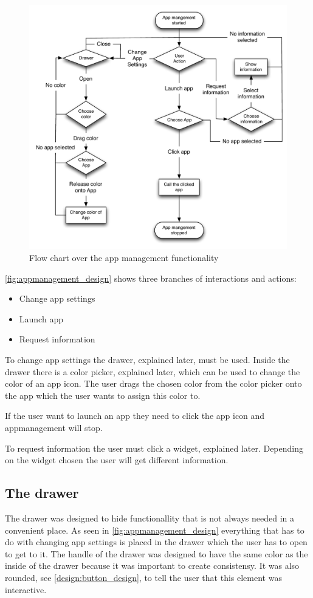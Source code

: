 \begin{figure}[!h]
	\centering
	\includegraphics[width=1\textwidth]{gfx/appmanagement.pdf}
	\caption{Flow chart over the app management functionality}
	\label{fig:appmanagement_design}
\end{figure}

\autoref{fig:appmanagement_design} shows three branches of interactions and actions:

\begin{itemize}
	\item Change app settings
	\item Launch app
	\item Request information
\end{itemize}

To change app settings the drawer, explained later, must be used. Inside the drawer there is a color picker, explained later, which can be used to change the color of an app icon. The user drags the chosen color from the color picker onto the app which the user wants to assign this color to.

If the user want to launch an app they need to click the app icon and appmanagement will stop.

To request information the user must click a widget, explained later. Depending on the widget chosen the user will get different information.

\subsection{The drawer}
\label{sec:drawer}
The drawer was designed to hide functionallity that is not always needed in a convenient place. As seen in \autoref{fig:appmanagement_design} everything that has to do with changing app settings is placed in the drawer which the user has to open to get to it.
The handle of the drawer was designed to have the same color as the inside of the drawer because it was important to create consistensy. 
It was also rounded, see \autoref{design:button_design}, to tell the user that this element was interactive.

